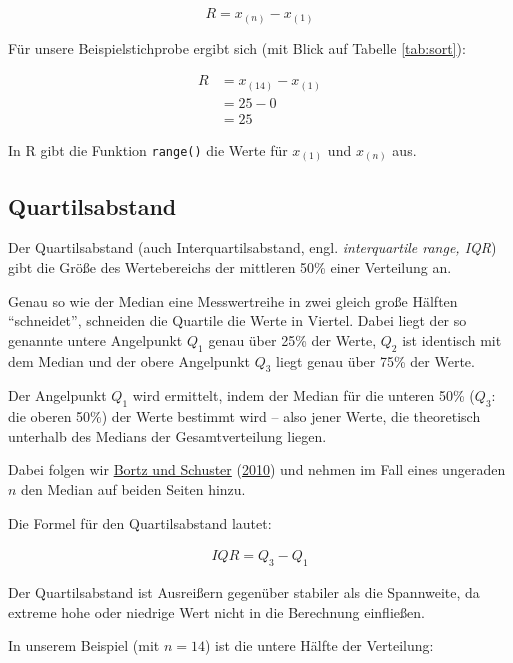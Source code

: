 \documentclass[
  11pt,
  ngerman,
  a4paper,
]{report}
\newenvironment{rtip}{
  \medskip
  \begin{tcolorbox}[colframe=purple,colback=light_gray,title=Softwarehinweis]
}{
  \end{tcolorbox}
  \medskip
}
\begin{document}
\[
 R=x_{(n)} - x_{(1)}
 \label{eq:range}
\]

Für unsere Beispielstichprobe ergibt sich (mit Blick auf Tabelle \ref{tab:sort}):

\nopagebreak

\[
  \begin{aligned}
     R&=x_{(14)} - x_{(1)} \\[4pt]
     &=25-0 \\[4pt]
     &=25
  \end{aligned}
\]

\begin{rtip}
In R gibt die Funktion \verb|range()| die Werte für $x_{(1)}$ und $x_{(n)}$ aus.
\end{rtip}

\hypertarget{quartilsabstand}{%
\subsection{Quartilsabstand}\label{quartilsabstand}}

Der Quartilsabstand (auch Interquartilsabstand, engl. \emph{interquartile range, IQR}) gibt die Größe des Wertebereichs der mittleren 50\% einer Verteilung an.

Genau so wie der Median eine Messwertreihe in zwei gleich große Hälften \enquote{schneidet}, schneiden die Quartile die Werte in Viertel. Dabei liegt der so genannte untere Angelpunkt \(Q_1\) genau über 25\% der Werte, \(Q_2\) ist identisch mit dem Median und der obere Angelpunkt \(Q_3\) liegt genau über 75\% der Werte.

Der Angelpunkt \(Q_1\) wird ermittelt, indem der Median für die unteren 50\% (\(Q_3\): die oberen 50\%) der Werte bestimmt wird -- also jener Werte, die theoretisch unterhalb des Medians der Gesamtverteilung liegen.

Dabei folgen wir \protect\hyperlink{ref-bortz}{Bortz und Schuster} (\protect\hyperlink{ref-bortz}{2010}) und nehmen im Fall eines ungeraden \(n\) den Median auf beiden Seiten hinzu.

Die Formel für den Quartilsabstand lautet:

\[
  \begin{aligned}
    \mathit{IQR}=Q_3-Q_1
  \end{aligned}
  \label{eq:iqr}
\]

Der Quartilsabstand ist Ausreißern gegenüber stabiler als die Spannweite, da extreme hohe oder niedrige Wert nicht in die Berechnung einfließen.

In unserem Beispiel (mit \(n=14\)) ist die untere Hälfte der Verteilung:
\end{document}
